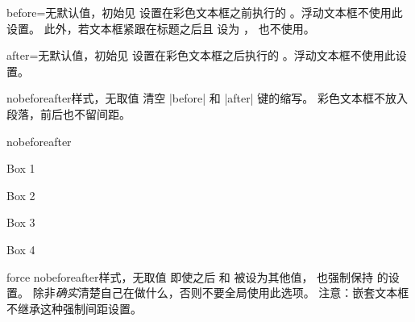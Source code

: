 \begin{docTcbKey}{before}{=}{无默认值，初始见 }
  设置在彩色文本框之前执行的 。浮动文本框不使用此设置。
  此外，若文本框紧跟在标题之后且  设为 ，
  也不使用。
\end{docTcbKey}

\begin{docTcbKey}{after}{=}{无默认值，初始见 }
  设置在彩色文本框之后执行的 。浮动文本框不使用此设置。
\end{docTcbKey}


\begin{docTcbKey}{nobeforeafter}{}{样式，无取值}
  清空 |before| 和 |after| 键的缩写。
  彩色文本框不放入段落，前后也不留间距。
\begin{exdispExample}{nobeforeafter}
\begin{tcolorbox}[myone,title=Box 1]Box 1\end{tcolorbox}%
\begin{tcolorbox}[myone,title=Box 2]Box 2\end{tcolorbox}%
\begin{tcolorbox}[myone,title=Box 3]Box 3\end{tcolorbox}%
\begin{tcolorbox}[myone,title=Box 4]Box 4\end{tcolorbox}
\end{exdispExample}
\end{docTcbKey}

\begin{docTcbKey}{force nobeforeafter}{}{样式，无取值}
  即使之后  和  被设为其他值，
  也强制保持  的设置。
  除非\emph{确实}清楚自己在做什么，否则不要全局使用此选项。
  注意：嵌套文本框不继承这种强制间距设置。
\end{docTcbKey}


\clearpage

